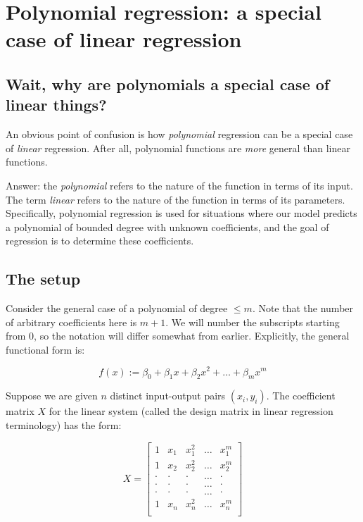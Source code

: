 \documentclass[10pt]{amsart}
\begin{document}
\section{Polynomial regression: a special case of linear regression}

\subsection{Wait, why are polynomials a special case of linear things?}

An obvious point of confusion is how {\em polynomial} regression can
be a special case of {\em linear} regression. After all, polynomial
functions are {\em more} general than linear functions.

Answer: the {\em polynomial} refers to the nature of the function in
terms of its input. The term {\em linear} refers to the nature of the
function in terms of its parameters. Specifically, polynomial
regression is used for situations where our model predicts a
polynomial of bounded degree with unknown coefficients, and the goal
of regression is to determine these coefficients.

\subsection{The setup}

Consider the general case of a polynomial of degree $\le m$. Note that
the number of arbitrary coefficients here is $m + 1$. We will number
the subscripts starting from $0$, so the notation will differ somewhat
from earlier. Explicitly, the general functional form is:

$$f(x) := \beta_0 + \beta_1x + \beta_2x^2 + \dots + \beta_mx^m$$

Suppose we are given $n$ distinct input-output pairs $(x_i,y_i)$. The
coefficient matrix $X$ for the linear system (called the design matrix
in linear regression terminology) has the form:

$$X = \left[ \begin{matrix} 1 & x_1 & x_1^2 & \dots & x_1^m \\ 1 & x_2 & x_2^2 & \dots & x_2^m \\ \cdot & \cdot & \cdot & \dots & \cdot \\  \cdot & \cdot & \cdot & \dots & \cdot \\  \cdot & \cdot & \cdot & \dots & \cdot \\ 1 & x_n & x_n^2 & \dots & x_n^m \\\end{matrix}\right]$$
\end{document}
